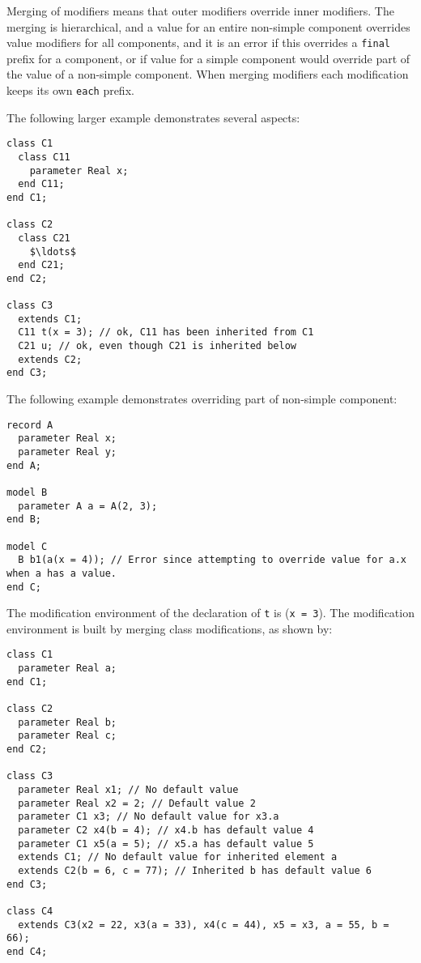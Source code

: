 Merging of modifiers means that outer modifiers override inner modifiers.  The merging is hierarchical, and a value for an entire non-simple component overrides value modifiers for all components, and it is an error if this overrides a \lstinline!final! prefix for a component, or if value for a simple component would override part of the value of a non-simple component. When merging modifiers each modification keeps its own \lstinline!each! prefix.

\begin{example}
The following larger example demonstrates several aspects:
\begin{lstlisting}[language=modelica]
class C1
  class C11
    parameter Real x;
  end C11;
end C1;

class C2
  class C21
    $\ldots$
  end C21;
end C2;

class C3
  extends C1;
  C11 t(x = 3); // ok, C11 has been inherited from C1
  C21 u; // ok, even though C21 is inherited below
  extends C2;
end C3;
\end{lstlisting}
The following example demonstrates overriding part of non-simple component:
\begin{lstlisting}[language=modelica]
record A
  parameter Real x;
  parameter Real y;
end A;

model B
  parameter A a = A(2, 3);
end B;

model C
  B b1(a(x = 4)); // Error since attempting to override value for a.x when a has a value.
end C;
\end{lstlisting}

The modification environment of the declaration of \lstinline!t! is
(\lstinline!x = 3!). The modification environment is built by merging class modifications, as shown by:
\begin{lstlisting}[language=modelica]
class C1
  parameter Real a;
end C1;

class C2
  parameter Real b;
  parameter Real c;
end C2;

class C3
  parameter Real x1; // No default value
  parameter Real x2 = 2; // Default value 2
  parameter C1 x3; // No default value for x3.a
  parameter C2 x4(b = 4); // x4.b has default value 4
  parameter C1 x5(a = 5); // x5.a has default value 5
  extends C1; // No default value for inherited element a
  extends C2(b = 6, c = 77); // Inherited b has default value 6
end C3;

class C4
  extends C3(x2 = 22, x3(a = 33), x4(c = 44), x5 = x3, a = 55, b = 66);
end C4;
\end{lstlisting}


\end{example}
